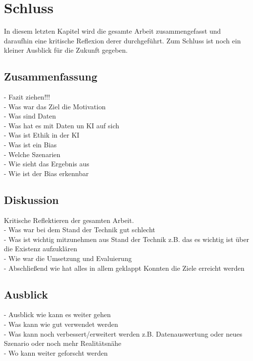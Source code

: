 \chapter{Schluss}
\label{sec:schluss}
In diesem letzten Kapitel wird die gesamte Arbeit zusammengefasst und daraufhin eine kritische Reflexion derer durchgeführt. Zum Schluss ist noch ein kleiner Ausblick für die Zukunft gegeben.
\section{Zusammenfassung}
\label{zusammenfassung}
-   Fazit ziehen!!! \\
- Was war das Ziel die Motivation\\
- Was sind Daten\\
- Was hat es mit Daten un KI auf sich\\
- Was ist Ethik in der KI \\
- Was ist ein Bias \\
- Welche Szenarien\\
- Wie sieht das Ergebnis aus\\
- Wie ist der Bias erkennbar
\section{Diskussion}
\label{diskussion}
Kritische Reflektieren der gesamten Arbeit.\\
- Was war bei dem Stand der Technik gut schlecht\\
- Was ist wichtig mitzunehmen aus Stand der Technik z.B. das es wichtig ist über die Existenz aufzuklären\\
- Wie war die Umsetzung und Evaluierung\\
- Abschließend wie hat alles in allem geklappt Konnten die Ziele erreicht werden

\section{Ausblick}
\label{ausblick}
- Ausblick wie kann es weiter gehen\\
- Was kann wie gut verwendet werden\\
- Was kann noch verbessert/erweitert werden z.B. Datenauswertung oder neues Szenario oder noch mehr Realitätsnähe\\
- Wo kann weiter geforscht werden\\
    \newpage
